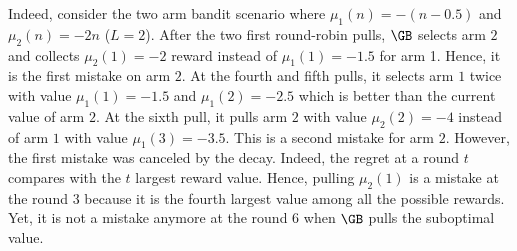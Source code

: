 Indeed, consider the two arm bandit scenario where $\mu_1(n) = -(n-0.5)$ and $\mu_2(n) = -2n$ ($L=2$). After the two first round-robin pulls, $\GB$ selects arm $2$ and collects $\mu_2(1)=-2$ reward instead of $\mu_1(1)= -1.5$ for arm 1. Hence, it is the first mistake on arm $2$. At the fourth and fifth pulls, it selects arm $1$ twice with value $\mu_1(1) = -1.5$ and $\mu_1(2)= -2.5$ which is better than the current value of arm $2$. At the sixth pull, it pulls arm $2$ with value $\mu_2(2) = -4$ instead of arm $1$ with value $\mu_1(3)=-3.5$. This is a second mistake for arm $2$. However, the first mistake was canceled by the decay. Indeed, the regret at a round $t$ compares with the $t$ largest reward value. Hence, pulling $\mu_2(1)$ is a mistake at the round $3$ because it is the fourth largest value among all the possible rewards. Yet, it is not a mistake anymore at the round $6$ when $\GB$ pulls the suboptimal value.


